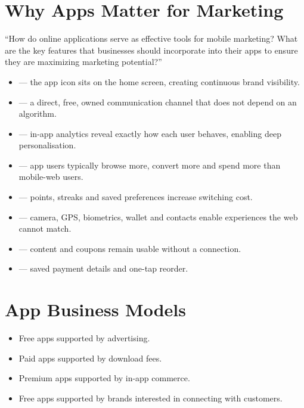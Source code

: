 \section{Why Apps Matter for Marketing}

\begin{keybox}
``How do online applications serve as effective tools for mobile marketing? What
are the key features that businesses should incorporate into their apps to ensure
they are maximizing marketing potential?''
\end{keybox}

\begin{itemize}
\item {} --- the app icon sits on the home screen, creating
      continuous brand visibility.
\item {} --- a direct, free, owned communication
      channel that does not depend on an algorithm.
\item {} --- in-app analytics reveal exactly how each
      user behaves, enabling deep personalisation.
\item {} --- app users typically browse more,
      convert more and spend more than mobile-web users.
\item {} --- points, streaks and saved preferences
      increase switching cost.
\item {} --- camera, GPS, biometrics, wallet and
      contacts enable experiences the web cannot match.
\item {} --- content and coupons remain usable without a
      connection.
\item {} --- saved payment details and one-tap
      reorder.
\end{itemize}

\section{App Business Models}

\begin{itemize}
\item Free apps supported by advertising.
\item Paid apps supported by download fees.
\item Premium apps supported by in-app commerce.
\item Free apps supported by brands interested in connecting with customers.
\end{itemize}

